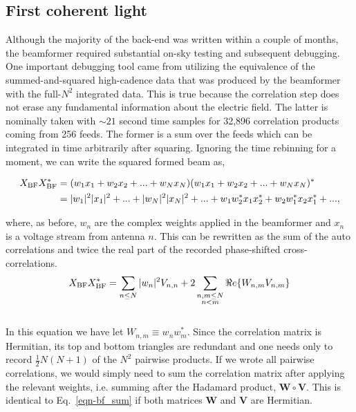 \subsection{First coherent light}
Although the majority of the back-end was written within a couple  
of months, the beamformer required substantial 
on-sky testing and subsequent debugging. One important debugging tool 
came from utilizing the equivalence of the summed-and-squared
high-cadence data that was produced by the beamformer with the 
full-$N^2$ integrated data. This is true because the correlation 
step does not erase any fundamental information about the electric field. 
The latter is nominally taken with $\sim21$ second
time samples for 32,896 correlation products coming from 256 feeds. 
The former is a sum over the feeds which can be integrated in time 
arbitrarily after squaring. Ignoring the time rebinning for a moment,
we can write the squared formed beam as,

\begin{align}
X_{\rm BF} X_{\rm BF}^* &= (w_1 x_1 + w_2 x_2 + ... + w_N x_N) (w_1 x_1 + w_2 x_2 + ... + w_N x_N)^*\\
&= |w_1|^2|x_1|^2 + ... + |w_N|^2|x_N|^2 + ... + w_1 w_2^* x_1 x_2^* + w_2 w_1^* x_2 x_1^* + ... , 
\end{align}

\noindent where, as before, $w_n$ are the 
complex weights applied in the beamformer 
and $x_n$ is a voltage stream from antenna $n$.
This can be rewritten as the sum of the 
auto correlations and twice the real part of the recorded 
phase-shifted cross-correlations.
\\

\begin{equation}
\label{eqn-bf_sum}
X_{\rm BF} X_{\rm BF}^* = \sum_{n\le N} |w_n|^2 V_{n, n} + 
2 \sum_{\substack{n,m\le N \\ n<m}} \Re e\{W_{n, m} V_{n, m}\}
\end{equation}
\\

In this equation we have let $W_{n, m} \equiv w_n w_m^*$.
Since the correlation matrix is Hermitian, its top 
and bottom triangles are redundant and one needs only to 
record $\frac{1}{2} N (N+1)$ of the $N^2$ pairwise products.
If we wrote all pairwise correlations, we would simply need 
to sum the correlation matrix after applying the relevant 
weights, i.e. summing after the Hadamard
product, $\mathbf{W} \circ \mathbf{V}$. This is identical 
to Eq.~\ref{eqn-bf_sum} if both matrices $\mathbf{W}$ and 
$\mathbf{V}$ are Hermitian. 

